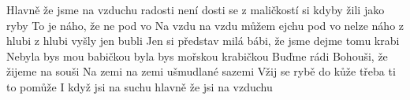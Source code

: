 \begin{TEXT}{Hlavně že jsme na vzduchu}
\SLOKA {} radosti není dosti
 se z maličkostí
 si  kdyby
 žili jako ryby
To je  náho,
že ne pod vo
Na vzdu na vzdu
můžem  ejchu
 pod vo
nelze  náho
z hlubi z hlubi
vyšly  jen bubli
\SLOKA Jen si představ milá bábi,
že jsme dejme tomu krabi
Nebyla bys mou babičkou
byla bys mořskou krabičkou
Buďme rádi Bohouši,
že žijeme na souši
Na zemi na zemi
ušmudlané sazemi
Vžij se rybě do kůže
třeba ti to pomůže
I když jsi na suchu
hlavně že jsi na vzduchu
\end{TEXT}